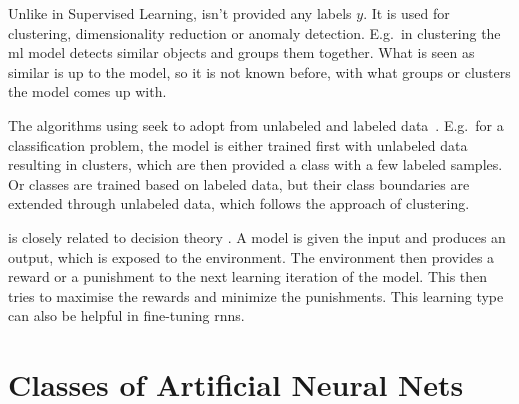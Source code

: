 Unlike in Supervised Learning,  isn't provided any labels $y$.
It is used for clustering, dimensionality reduction or anomaly detection. %
E.g.\ in clustering the \gls{ml} model detects similar objects and groups them together.
What is seen as similar is up to the model, so it is not known before, with what groups or clusters the model comes up with.

The algorithms using  seek to adopt from unlabeled and labeled data~\cite{van2020survey}.
E.g.\ for a classification problem, the model is either trained first with unlabeled data resulting in clusters, which are then provided a class with a few labeled samples.
Or classes are trained based on labeled data, but their class boundaries are extended through unlabeled data, which follows the approach of clustering.


 is closely related to decision theory \cite{ghahramani2003unsupervised}.
A model is given the input and produces an output, which is exposed to the environment.
The environment then provides a reward or a punishment to the next learning iteration of the model.
This then tries to maximise the rewards and minimize the punishments.
This learning type can also be helpful in fine-tuning \gls{rnn}s.

\section{Classes of Artificial Neural Nets}
\label{sec:neural-net-classes}

